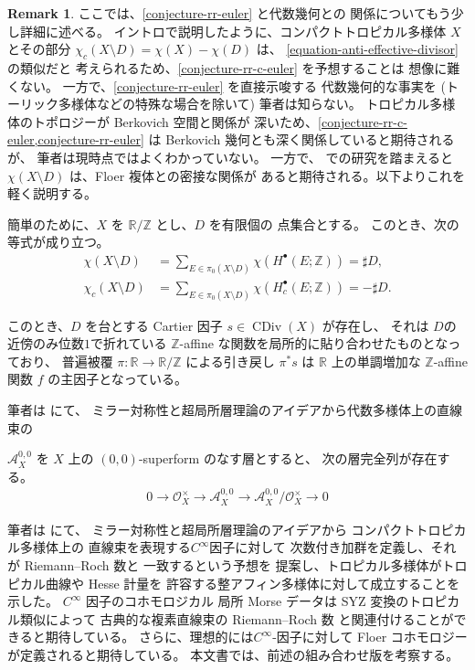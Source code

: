\documentclass[a4paper,dvipdfmx,reqno,12pt]{amsart}
\theoremstyle{definition}
\newtheorem{remark}[theorem]{Remark}
\newcommand{\opn}[1]{\operatorname{#1}}
\numberwithin{equation}{section}
\begin{document}
\begin{remark}
\label{remark-c-infinity-divisor}
ここでは、\cref{conjecture-rr-euler} と代数幾何との
関係についてもう少し詳細に述べる。
イントロで説明したように、コンパクトトロピカル多様体 $X$
とその部分
$\chi_c(X\setminus D)=\chi(X)-\chi(D)$ は、
\cref{equation-anti-effective-divisor} の類似だと
考えられるため、\cref{conjecture-rr-c-euler} を予想することは
想像に難くない。
一方で、\cref{conjecture-rr-euler} を直接示唆する
代数幾何的な事実を (トーリック多様体などの特殊な場合を除いて)
筆者は知らない。
トロピカル多様体のトポロジーが Berkovich 空間と関係が
深いため、\cref{conjecture-rr-c-euler,conjecture-rr-euler}
は Berkovich 幾何とも深く関係していると期待されるが、
筆者は現時点ではよくわかっていない。
一方で、\cite{tsutsui2023graded} での研究を踏まえると
$\chi(X\setminus D)$ は、Floer 複体との密接な関係が
あると期待される。以下よりこれを軽く説明する。

簡単のために、$X$ を $\mathbb{R}/\mathbb{Z}$ とし、$D$ を有限個の
点集合とする。
このとき、次の等式が成り立つ。
\begin{align}
\chi(X\setminus D) &=\sum_{E\in \pi_0(X\setminus D)} 
\chi(H^{\bullet}(E;\mathbb{Z}))=\sharp D, \\
\chi_c(X\setminus D) &=\sum_{E\in \pi_0(X\setminus D)} 
\chi(H^{\bullet}_c(E;\mathbb{Z}))=-\sharp D.
\end{align}

このとき、$D$ を台とする Cartier 因子
$s\in \opn{CDiv}(X)$ が存在し、
それは $D$の近傍のみ位数$1$で折れている
$\mathbb{Z}$-affine な関数を局所的に貼り合わせたものとなっており、
普遍被覆 $\pi\colon \mathbb{R}\to \mathbb{R}/\mathbb{Z}$ 
による引き戻し $\pi^{*}s$ は $\mathbb{R}$ 上の単調増加な
$\mathbb{Z}$-affine 関数 $f$ の主因子となっている。

筆者は \cite{tsutsui2023graded} にて、
ミラー対称性と超局所層理論のアイデアから代数多様体上の直線束の

$\mathcal{A}^{0,0}_X$ を $X$ 上の
$(0,0)$-superform のなす層とすると、
次の層完全列が存在する。
\begin{align}
0\to \mathcal{O}_X^{\times} \to \mathcal{A}^{0,0}_X
\to \mathcal{A}^{0,0}_X/\mathcal{O}_X^{\times} \to 0
\end{align}

筆者は \cite{tsutsui2023graded} にて、
ミラー対称性と超局所層理論のアイデアから
コンパクトトロピカル多様体上の
直線束を表現する$C^{\infty}$因子に対して
次数付き加群を定義し、それが Riemann--Roch 数と
一致するという予想\cite[Conjecture 1.2]{tsutsui2023graded}を
提案し、トロピカル多様体がトロピカル曲線や Hesse 計量を
許容する整アフィン多様体に対して成立することを示した。
$C^{\infty}$ 因子のコホモロジカル
局所 Morse データは SYZ 変換のトロピカル類似によって
古典的な複素直線束の Riemann--Roch 数
と関連付けることができると期待している。
さらに、理想的には$C^{\infty}$-因子に対して
Floer コホモロジーが定義されると期待している。
本文書では、前述の組み合わせ版を考察する。

\end{remark}
\end{document}
